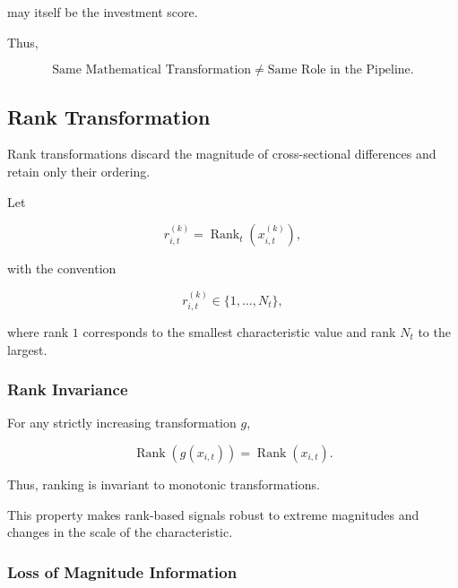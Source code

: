 \documentclass[11pt,a4paper]{article}
\begin{document}
may itself be the investment score.

Thus,

\begin{equation}
\boxed{
\text{Same Mathematical Transformation}
\neq
\text{Same Role in the Pipeline}.
}
\end{equation}


\subsection{Rank Transformation}
\label{subsec:rank_transformation}

Rank transformations discard the magnitude of cross-sectional differences and
retain only their ordering.

Let

\begin{equation}
r_{i,t}^{(k)}
=
\operatorname{Rank}_t
\left(
x_{i,t}^{(k)}
\right),
\end{equation}

with the convention

\begin{equation}
r_{i,t}^{(k)}
\in
\{1,\ldots,N_t\},
\end{equation}

where rank $1$ corresponds to the smallest characteristic value and rank $N_t$
to the largest.


\subsubsection{Rank Invariance}

For any strictly increasing transformation $g$,

\begin{equation}
\boxed{
\operatorname{Rank}
\left(
g(x_{i,t})
\right)
=
\operatorname{Rank}
\left(
x_{i,t}
\right).
}
\end{equation}

Thus, ranking is invariant to monotonic transformations.

This property makes rank-based signals robust to extreme magnitudes and changes
in the scale of the characteristic.


\subsubsection{Loss of Magnitude Information}
\end{document}
